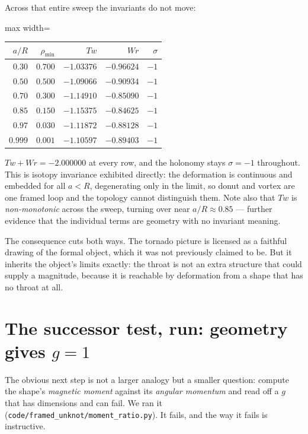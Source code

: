 \documentclass[11pt,a4paper]{article}
\begin{document}
Across that entire sweep the invariants do not move:

\begin{center}
\begin{adjustbox}{max width=\linewidth}\begin{tabular}{@{}rrrrr@{}}
\toprule
$a/R$ & $\rho_{\min}$ & $Tw$ & $Wr$ & $\sigma$ \\
\midrule
$0.30$ & $0.700$ & $-1.03376$ & $-0.96624$ & $-1$ \\
$0.50$ & $0.500$ & $-1.09066$ & $-0.90934$ & $-1$ \\
$0.70$ & $0.300$ & $-1.14910$ & $-0.85090$ & $-1$ \\
$0.85$ & $0.150$ & $-1.15375$ & $-0.84625$ & $-1$ \\
$0.97$ & $0.030$ & $-1.11872$ & $-0.88128$ & $-1$ \\
$0.999$& $0.001$ & $-1.10597$ & $-0.89403$ & $-1$ \\
\bottomrule
\end{tabular}\end{adjustbox}
\end{center}

$Tw + Wr = -2.000000$ at every row, and the holonomy stays $\sigma = -1$
throughout.  This is isotopy invariance exhibited directly:
the deformation is continuous and embedded for all $a < R$, degenerating
only in the limit, so donut and vortex are one framed loop and the
topology cannot distinguish them.  Note also that $Tw$ is
\emph{non-monotonic} across the sweep, turning over near $a/R \approx
0.85$ --- further evidence that the individual terms are geometry with no
invariant meaning.

The consequence cuts both ways.  The tornado picture is licensed as a
faithful drawing of the formal object, which it was not previously
claimed to be.  But it inherits the object's limits exactly: the throat
is not an extra structure that could supply a magnitude, because it is
reachable by deformation from a shape that has no throat at all.

\section{The successor test, run: geometry gives $g=1$}
\label{sec:moment}

The obvious next step is not a larger analogy but a smaller question:
compute the shape's \emph{magnetic moment} against its \emph{angular
momentum} and read off a $g$ that has dimensions and can fail.  We ran it
(\nolinkurl{code/framed_unknot/moment_ratio.py}).  It fails, and the way it
fails is instructive.
\end{document}
